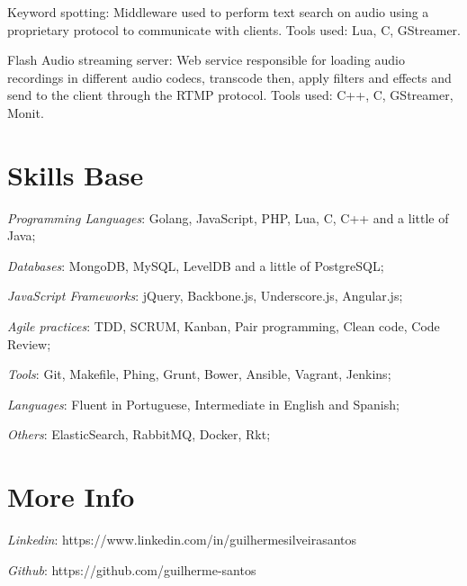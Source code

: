 \documentclass[margin]{res}
\begin{document}
\begin{resume}
Keyword spotting: Middleware used to perform text search on audio using a proprietary protocol to communicate with clients. Tools used: Lua, C, GStreamer.

Flash Audio streaming server: Web service responsible for loading audio recordings in different audio codecs, transcode then, apply filters and effects and send to the client through the RTMP protocol. Tools used: C++, C, GStreamer, Monit.

\section{Skills Base} \textit{Programming Languages}: Golang, JavaScript, PHP, Lua, C, C++ and a little of Java;

	\textit{Databases}: MongoDB, MySQL, LevelDB and a little of PostgreSQL;
	
	\textit{JavaScript Frameworks}: jQuery, Backbone.js, Underscore.js, Angular.js;

	\textit{Agile practices}: TDD, SCRUM, Kanban, Pair programming, Clean code, Code Review;
	
	\textit{Tools}: Git, Makefile, Phing, Grunt, Bower, Ansible, Vagrant, Jenkins;
	
	\textit{Languages}: Fluent in Portuguese, Intermediate in English and Spanish;
	
	\textit{Others}: ElasticSearch, RabbitMQ, Docker, Rkt;

\section{More Info} \textit{Linkedin}: https://www.linkedin.com/in/guilhermesilveirasantos

    \textit{Github}: https://github.com/guilherme-santos

\end{resume}
\end{document}
